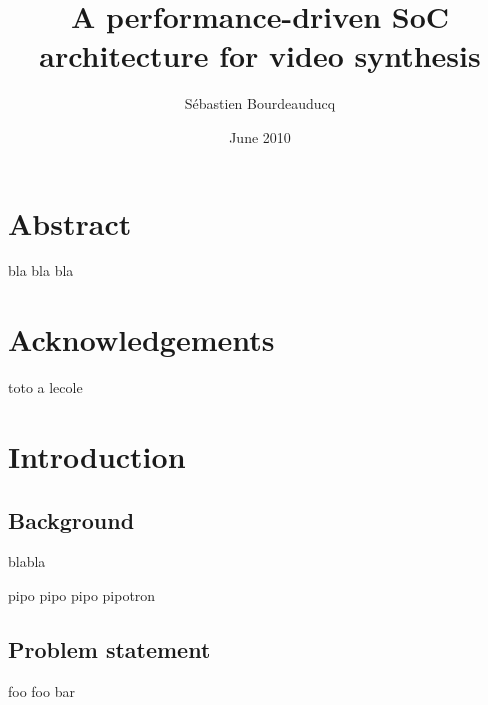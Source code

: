 \documentclass[a4paper,11pt]{book}
\title{A performance-driven SoC architecture for video synthesis}
\date{June 2010}
\author{S\'ebastien Bourdeauducq}
\begin{document}
\maketitle{}
\chapter*{Abstract}
bla bla bla
\chapter*{Acknowledgements}
toto a lecole
\tableofcontents
\chapter{Introduction}
\section{Background}
blabla

pipo pipo pipo pipotron\cite{milkymist}

\section{Problem statement}
foo foo bar

{}

\end{document}
